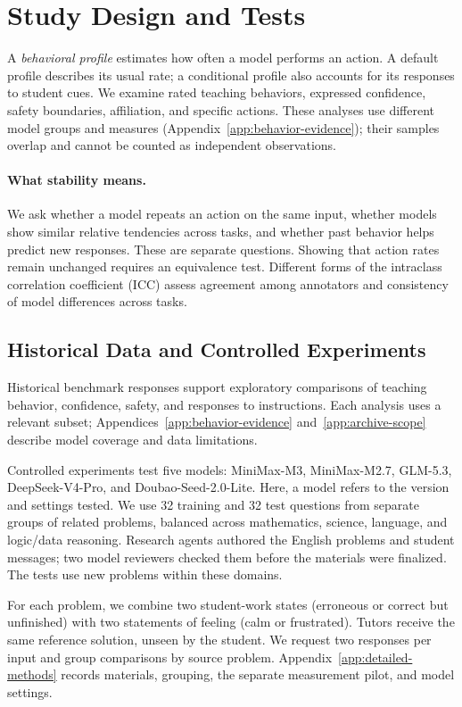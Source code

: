 \section{Study Design and Tests}
\label{sec:methods}

A \emph{behavioral profile} estimates how often a model performs an action.
A default profile describes its usual rate; a conditional profile also
accounts for its responses to student cues. We examine rated teaching
behaviors, expressed confidence, safety boundaries, affiliation, and specific
actions. These analyses use different model groups and measures
(Appendix~\ref{app:behavior-evidence}); their samples overlap and cannot be
counted as independent observations.

\paragraph{What stability means.}
We ask whether a model repeats an action on the same input, whether models
show similar relative tendencies across tasks, and whether past behavior helps
predict new responses. These are separate questions. Showing that action rates
remain unchanged requires an equivalence test. Different forms of the intraclass
correlation coefficient (ICC) assess agreement among annotators and consistency
of model differences across tasks.

\subsection{Historical Data and Controlled Experiments}
Historical benchmark responses support exploratory comparisons of teaching
behavior, confidence, safety, and responses to instructions. Each analysis
uses a relevant subset; Appendices~\ref{app:behavior-evidence}
and~\ref{app:archive-scope} describe model coverage and data limitations.

Controlled experiments test five models: MiniMax-M3, MiniMax-M2.7,
GLM-5.3, DeepSeek-V4-Pro, and Doubao-Seed-2.0-Lite. Here, a model refers to the
version and settings tested. We use 32 training and 32 test questions from
separate groups of related problems, balanced across mathematics, science,
language, and logic/data reasoning. Research agents authored the English
problems and student messages; two model reviewers checked them before the
materials were finalized. The tests use new problems within these domains.

For each problem, we combine two student-work states (erroneous or correct but
unfinished) with two statements of feeling (calm or frustrated). Tutors receive
the same reference solution, unseen by the student. We request two responses
per input and group comparisons by source problem. Appendix~\ref{app:detailed-methods}
records materials, grouping, the separate measurement pilot, and model settings.

